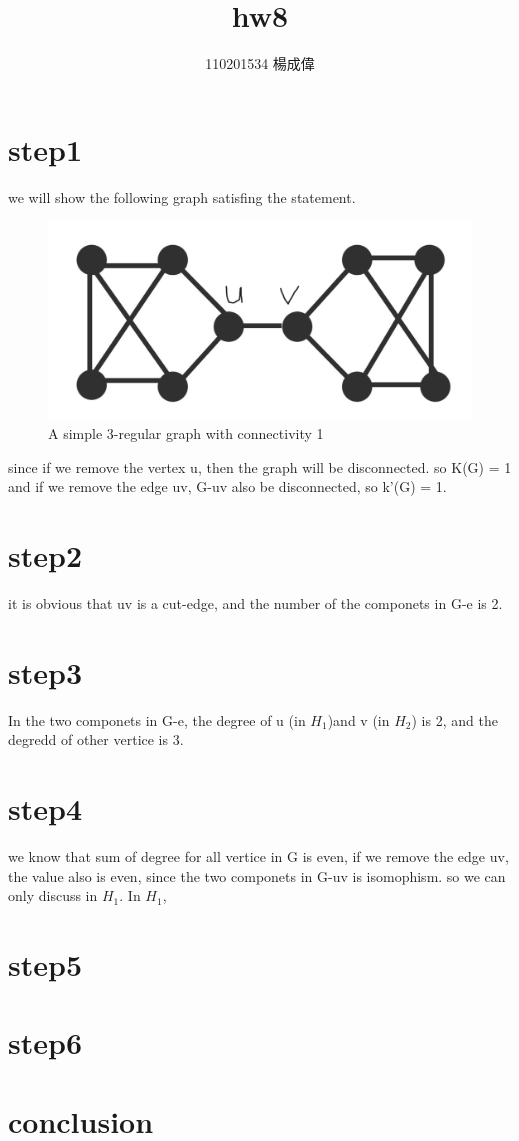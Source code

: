 \documentclass{article}
\title{hw8}
\author{110201534 楊成偉}
\date{}
\begin{document}
\begin{CJK*}{UTF8}{bkai}
\maketitle

\section*{step1}
we will show the following graph satisfing the statement.
\begin{figure}[H]
    \centering
    \includegraphics[scale = 0.1]{hw8g.jpg}
    \caption{A simple 3-regular graph with connectivity 1}
\end{figure}
since if we remove the vertex u, then the graph will be disconnected. so K(G) = 1 and if we remove the edge uv, G-uv also be disconnected, so k'(G) = 1.
\section*{step2}
it is obvious that uv is a cut-edge, and the number of the componets in G-e is 2.
\section*{step3}
In the two componets in G-e, the degree of u (in $H_{1}$)and v (in $H_{2}$) is 2, and the degredd of other vertice is 3.
\section*{step4}
we know that sum of degree for all vertice in G is even, if we remove the edge uv, the value also is even, since the two componets in G-uv is isomophism. so we can only discuss in $H_{1}$. In $H_{1}$, 
\section*{step5}

\section*{step6}

\section*{conclusion}

\end{CJK*}
\end{document}
